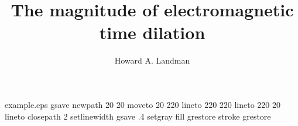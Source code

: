 %
%
%
%
%
\begin{filecontents*}{example.eps}
gsave
newpath
  20 20 moveto
  20 220 lineto
  220 220 lineto
  220 20 lineto
closepath
2 setlinewidth
gsave
  .4 setgray fill
grestore
stroke
grestore
\end{filecontents*}
%
\RequirePackage{fix-cm}
%
\documentclass[smallextended]{svjour3}       %
%
\smartqed  %
%
\usepackage{graphicx}
%
%
%
%
%


\title{The magnitude of electromagnetic time dilation%
}


\author{Howard A. Landman}



